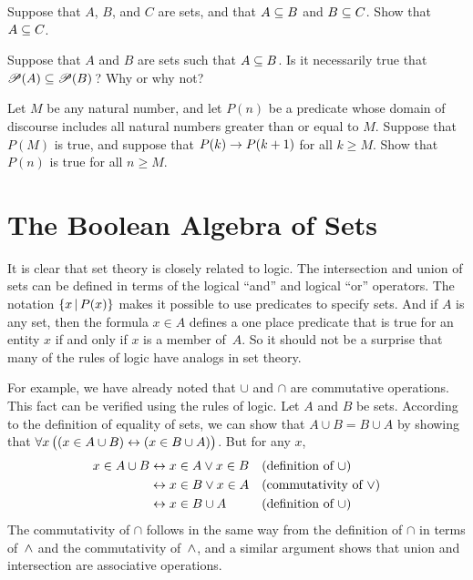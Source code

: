 \begin{exercises}
\problem\label{E-subtrans}Suppose that $A$, $B$, and $C$ are sets, and that
$A\subseteq B$ and $B\subseteq C$.  Show that $A\subseteq C$.

\problem Suppose that $A$ and $B$ are sets such that $A\subseteq B$.
Is it necessarily true that ${\mathscr P}(A)\subseteq {\mathscr P}(B)\,$?
Why or why not?


\problem Let $M$ be any natural number, and let $P(n)$ be a
predicate whose domain of discourse includes all natural numbers
greater than or equal to $M$.  Suppose that $P(M)$ is true,
and suppose that $P(k)\rightarrow P(k+1)$ for all $k\ge M$.
Show that $P(n)$ is true for all $n\ge M$.


\end{exercises}




\section{The Boolean Algebra of Sets}\label{S-sets-2}

It is clear that set theory is closely related to logic.
The intersection and union
of sets can be defined in terms of the logical ``and''
and logical ``or'' operators.
The notation $\{x\,|\, P(x)\}$ makes it possible to use predicates
to specify sets.  And if $A$ is any set, then the formula
$x\in A$ defines a one place predicate that is true for an entity $x$
if and only if $x$ is a member of~$A$.  So it should not be a
surprise that many of the rules of logic have analogs in
set theory.

For example, we have already noted that $\cup$ and $\cap$ are
commutative operations.   This fact can be verified using the
rules of logic.  Let $A$ and $B$ be sets.  According to the definition 
of equality of sets, we can show that $A\cup B=B\cup A$ by showing
that $\forall x\,\big((x\in A\cup B)\leftrightarrow(x\in B\cup A)\big)$.
But for any $x$,
\begin{align*}
x\in A\cup B &\leftrightarrow x\in A \vee x\in B  &&\text{(definition of $\cup$)}\\
             &\leftrightarrow x\in B \vee x\in A  &&\text{(commutativity of $\vee$)}\\
             &\leftrightarrow x\in B \cup A      &&\text{(definition of $\cup$)}
\end{align*}
The commutativity of $\cap$ follows in the same way from the
definition of $\cap$ in terms of~$\wedge$ and the commutativity of~$\wedge$,
and a similar argument shows that union and intersection are
associative operations.

